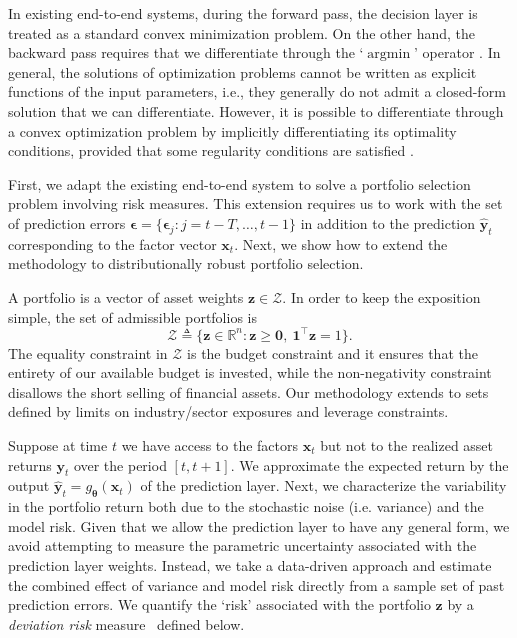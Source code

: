 \documentclass[10pt, twocolumn]{article}
\theoremstyle{plain}
\theoremstyle{definition}
\DeclareMathOperator*{\argmin}{argmin}
\begin{document}
In existing end-to-end systems, during the forward pass, the decision
layer is treated as a standard convex  minimization
problem. On the other hand, the backward pass requires that we
differentiate through the `\(\argmin\)' operator \citep{donti2017task}. In
general, the solutions of optimization problems cannot be written as
explicit functions of the input parameters, i.e., they generally do not 
admit a closed-form solution that we can differentiate. However, it is 
possible to differentiate through a convex optimization problem by 
implicitly differentiating its optimality conditions, provided that some 
regularity conditions are satisfied \citep{amos2017optnet, 
agrawal2019differentiable}.  

First, we adapt the existing end-to-end system to solve a portfolio selection 
problem involving risk measures. This extension requires us to
work with the set of prediction errors \(\bm{\epsilon} = \{\bm{\epsilon}_j : 
j = t-T, \ldots, t-1\}\) in addition to the prediction \(\hat{\bm{y}}_{t}\) 
corresponding to the factor vector \(\bm{x}_t\). Next, we show how to extend the 
methodology to distributionally robust portfolio selection.

A portfolio is a vector of asset weights \(\bm{z}\in\mathcal{Z}\). In
order to keep the exposition simple, the set of admissible portfolios is 
\[
	\mathcal{Z} \triangleq \big\{ \bm{z}\in\mathbb{R}^n : \bm{z}\geq\bm{0},\ \bm{1}^\top \bm{z} = 1\big\}.
\]
The equality constraint in \(\mathcal{Z}\) is the budget constraint and
it ensures that the entirety of our available budget is invested, while
the non-negativity constraint disallows the short selling of financial
assets. Our methodology extends to sets defined by limits on
industry/sector exposures and leverage constraints.   

Suppose at time \(t\) we have access to the factors \(\bm{x}_{t}\) but
not to the realized asset returns \(\bm{y}_{t}\) over the period \([t,t+1]\). 
We approximate the expected return by the output \(\hat{\bm{y}}_{t} = 
g_{\bm{\theta}}(\bm{x}_{t})\) of the prediction layer. Next, we characterize 
the variability in the portfolio return both due to the stochastic noise 
(i.e. variance) and the model risk. Given that we allow the 
prediction layer to have any general form, we avoid attempting to measure 
the parametric uncertainty associated with the prediction layer weights. Instead, 
we take a data-driven approach and estimate the combined effect of variance
and model risk directly from a sample set of past prediction errors. We quantify 
the `risk' associated with the portfolio \(\bm{z}\) by a \emph{deviation risk}
measure~\citep{rockafellar2006generalized} defined below. 
\end{document}
